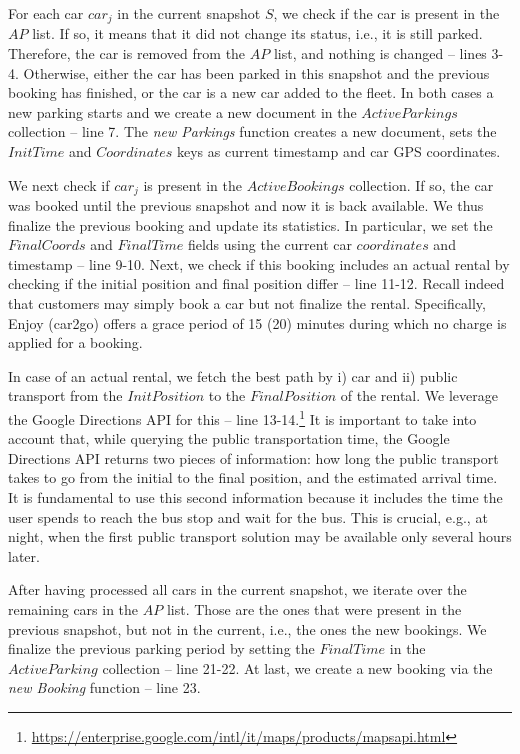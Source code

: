 For each car $car_j$ in the current snapshot $S$, we check if the car is present in the $AP$ list. 
If so, it means that it did not change its status, i.e., it is still parked. Therefore, the car is removed from the $AP$ list, and nothing is changed -- lines 3-4.
Otherwise, either the car has been parked in this snapshot and the previous booking has finished, or the car is a new car added to the fleet. In both cases a new parking starts and we create a new document in the $ActiveParkings$ collection -- line 7. The \textit{new Parkings} function creates a new document, sets the $InitTime$ and $Coordinates$ keys as current timestamp and car GPS coordinates.

We next check if $car_j$ is present in the $ActiveBookings$ collection. If so, the car was booked until the previous snapshot and now it is back available. We thus finalize the previous booking and update its statistics. In particular, we set the $FinalCoords$ and $FinalTime$ fields using the current car $coordinates$ and timestamp -- line 9-10. Next, we check if this booking includes an actual rental by checking if the initial position and final position differ -- line 11-12. Recall indeed that customers may simply book a car but not finalize the rental. Specifically, Enjoy (car2go) offers a grace period of 15 (20) minutes during which no charge is applied for a booking.

In case of an actual rental, we fetch the best path by i) car and ii) public transport from the  $InitPosition$ to the $FinalPosition$ of the rental. We leverage the  Google Directions API for this -- line 13-14.\footnote{\url{https://enterprise.google.com/intl/it/maps/products/mapsapi.html}}
It is important to take into account that, while querying the public transportation time, the Google Directions API returns two pieces of information: how long the public transport takes to go from the initial to the final position, and the estimated arrival time. It is fundamental to use this second information because  it includes the time the user spends to reach the bus stop and wait for the bus. This is crucial, e.g., at night, when the first public transport solution may be available only several hours later.

After having processed all cars in the current snapshot, we iterate over the remaining cars in the $AP$ list. Those are the ones that were present in the previous snapshot, but not in the current, i.e., the ones the new bookings. We finalize the previous parking period by setting the $FinalTime$ in the $ActiveParking$ collection -- line 21-22. At last, we create a new booking via the \textit{new Booking} function -- line 23.


